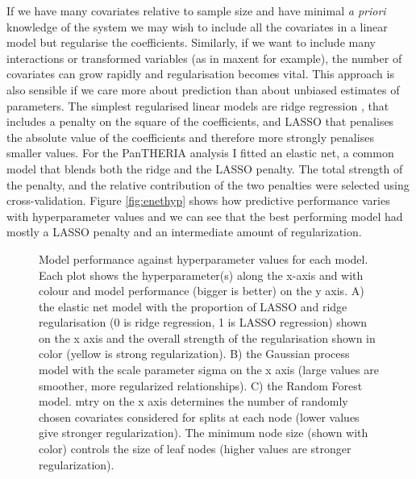 \documentclass[12pt,]{article}
\begin{document}
If we have many covariates relative to sample size and have minimal \emph{a priori} knowledge of the system we may wish to include all the covariates in a linear model but regularise the coefficients.
Similarly, if we want to include many interactions or transformed variables (as in maxent \citep{maxent} for example), the number of covariates can grow rapidly and regularisation becomes vital.
This approach is also sensible if we care more about prediction than about unbiased estimates of parameters.
The simplest regularised linear models are ridge regression \citep{ridge}, that includes a penalty on the square of the coefficients, and LASSO \citep{tibshirani1996regression} that penalises the absolute value of the coefficients and therefore more strongly penalises smaller values.
For the PanTHERIA analysis I fitted an elastic net, a common model that blends both the ridge and the LASSO penalty.
The total strength of the penalty, and the relative contribution of the two penalties were selected using cross-validation.
Figure \ref{fig:enethyp} shows how predictive performance varies with hyperparameter values and we can see that the best performing model had mostly a LASSO penalty and an intermediate amount of regularization.


\begin{figure}[t!]
  \centering
    \qquad

  \label{fig:hyp}
  \caption{
    Model performance against hyperparameter values for each model. Each plot shows the hyperparameter(s) along the x-axis and with colour and model performance (bigger is better) on the y axis. A) the elastic net model with the proportion of  LASSO and ridge regularisation (0 is ridge regression, 1 is LASSO regression) shown on the x axis and the overall strength of the regularisation shown in color (yellow is strong regularization).  B) the Gaussian process model with the scale parameter sigma on the x axis (large values are smoother, more regularized relationships). C) the Random Forest model. mtry on the x axis determines the number of randomly chosen covariates considered for splits at each node (lower values give stronger regularization). The minimum node size (shown with color) controls the size of leaf nodes (higher values are stronger regularization).
  }
\end{figure}
\end{document}
